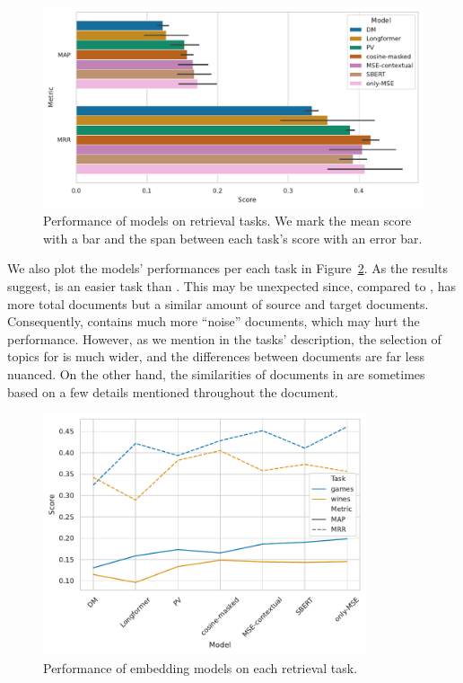 \begin{figure}

  \includegraphics[width=\textwidth]{img/final_sims_evals.pdf}

  \caption{Performance of models on retrieval tasks. We mark the mean score
  with a bar and the span between each task's score with an error bar.}

  \label{fig:final_eval_sims}

\end{figure}

We also plot the models' performances per each task in
Figure~\ref{fig:final_eval_sims_per_task}. As the results suggest, 
is an easier task than . This may be unexpected since, compared to
,  has more total documents but a similar amount of
source and target documents. Consequently,  contains much more
``noise'' documents, which may hurt the performance. However, as we mention in
the tasks' description, the selection of topics for  is much wider, and the differences between documents are far less nuanced. On the other hand, the
similarities of documents in  are sometimes based on a few details mentioned throughout the document.

\begin{figure}

  \centering
  \includegraphics[width=0.85\textwidth]{img/final_sims_evals_per_task.pdf}

  \caption{Performance of embedding models on each retrieval task.}

  \label{fig:final_eval_sims_per_task}

\end{figure}
